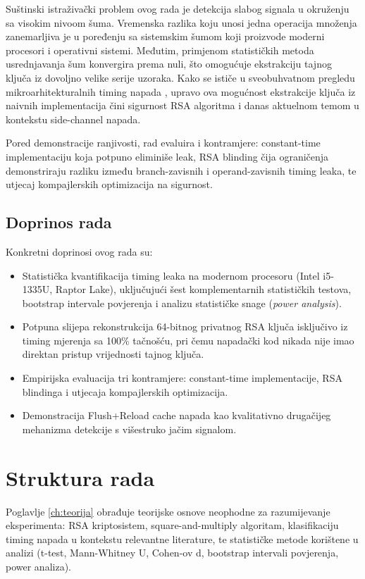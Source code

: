 Suštinski istraživački problem ovog rada je detekcija slabog signala u okruženju sa visokim nivoom šuma. Vremenska razlika koju unosi jedna operacija množenja zanemarljiva je u poređenju sa sistemskim šumom koji proizvode moderni procesori i operativni sistemi. Međutim, primjenom statističkih metoda usrednjavanja šum konvergira prema nuli, što omogućuje ekstrakciju tajnog ključa iz dovoljno velike serije uzoraka. Kako se ističe u sveobuhvatnom pregledu mikroarhitekturalnih timing napada \cite{ge2018}, upravo ova mogućnost ekstrakcije ključa iz naivnih implementacija čini sigurnost RSA algoritma i danas aktuelnom temom u kontekstu side-channel napada.

Pored demonstracije ranjivosti, rad evaluira i kontramjere: constant-time implementaciju koja potpuno eliminiše leak, RSA blinding čija ograničenja demonstriraju razliku između branch-zavisnih i operand-zavisnih timing leaka, te utjecaj kompajlerskih optimizacija na sigurnost.

\subsection{Doprinos rada}

Konkretni doprinosi ovog rada su:
\begin{itemize}
  \item Statistička kvantifikacija timing leaka na modernom procesoru (Intel i5-1335U, Raptor Lake), uključujući šest komplementarnih statističkih testova, bootstrap intervale povjerenja i analizu statističke snage (\textit{power analysis}).
  \item Potpuna slijepa rekonstrukcija 64-bitnog privatnog RSA ključa isključivo iz timing mjerenja sa 100\% tačnošću, pri čemu napadački kod nikada nije imao direktan pristup vrijednosti tajnog ključa.
  \item Empirijska evaluacija tri kontramjere: constant-time implementacije, RSA blindinga i utjecaja kompajlerskih optimizacija.
  \item Demonstracija Flush+Reload cache napada kao kvalitativno drugačijeg mehanizma detekcije s višestruko jačim signalom.
\end{itemize}

\section{Struktura rada}
\label{sec:struktura}

Poglavlje \ref{ch:teorija} obrađuje teorijske osnove neophodne za razumijevanje eksperimenta: RSA kriptosistem, square-and-multiply algoritam, klasifikaciju timing napada u kontekstu relevantne literature, te statističke metode korištene u analizi (t-test, Mann-Whitney U, Cohen-ov d, bootstrap intervali povjerenja, power analiza).

